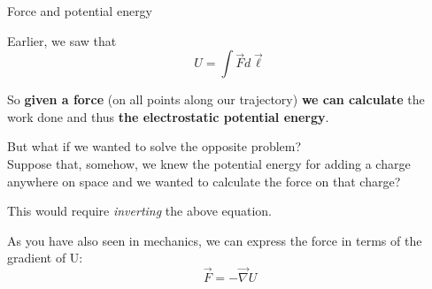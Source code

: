 %
%
%

\begin{frame}{Force and potential energy}

Earlier, we saw that
\begin{equation*}
  U = \int \vec{F} d\vec{\ell}
\end{equation*}

So {\bf given a force} (on all points along our trajectory)
{\bf we can calculate} the work done and thus {\bf the electrostatic potential energy}.\\

\vspace{0.3cm}

But what if we wanted to solve the opposite problem?\\
Suppose that, somehow, we knew the potential energy for adding a charge anywhere on space
and we wanted to calculate the force on that charge?\\

\vspace{0.2cm}

This would require {\em inverting} the above equation.\\

\vspace{0.2cm}

As you have also seen in mechanics,
we can express the force in terms of the gradient of U:
\begin{equation*}
  \vec{F} = -\vec{\nabla}U
\end{equation*}

\end{frame}

%
%


